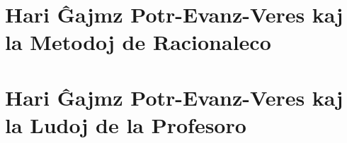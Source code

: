 \RequirePackage[pdf]{layout/hp-book}








\newcommand{\writtenNoteA}[1]{\par\textcolor{writtenNote}{#1}}
\renewcommand{\parsel}[1]{\textcolor{parsel}{#1}}
\renewcommand{\McGonagallWhiteBoard}[1]{\textcolor{McGonagallWhiteBoard}{\par#1}}
\renewcommand{\headline}[1]{\begin{center}\textcolor{headline}{#1}\end{center}}
\renewcommand{\inlineheadline}[1]{\textcolor{headline}{#1}}
\renewcommand{\newspaperHeader}[1]{#1}
\renewcommand{\hplettrineextrapara}[0]{}


\part{Hari Ĝajmz Potr-Evanz-Veres kaj la Metodoj de Racionaleco}
% 
% 
% 
% 
% 
% 
% 
% 
% 
% 
% 
% 
% 
% 
% 
% 
% 
% 
% 
% 
\part{Hari Ĝajmz Potr-Evanz-Veres kaj la Ludoj de la Profesoro}
% 
% 
% 
% 
% 
% 
% 
% 
% 
% 
% 
% 
% 
% 
% 
% 
